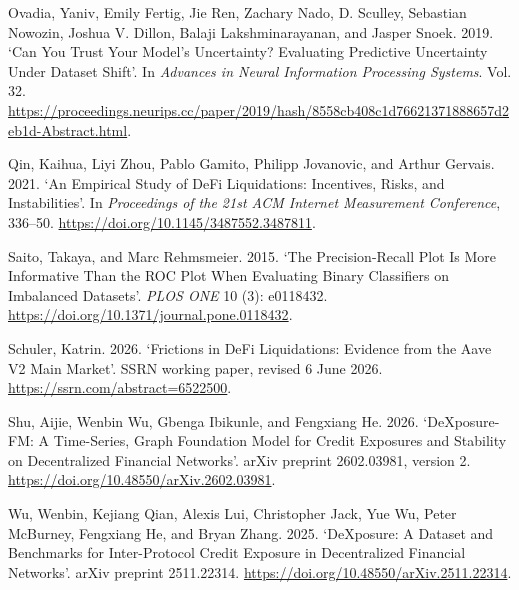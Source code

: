 \documentclass[
  10pt,
  a4paper,
]{article}
\newlength{\cslhangindent}
\newenvironment{CSLReferences}[2] %
 {\begin{list}{}{%
  \setlength{\itemindent}{0pt}
  \setlength{\leftmargin}{0pt}
  \setlength{\parsep}{0pt}
  \ifodd #1
   \setlength{\leftmargin}{\cslhangindent}
   \setlength{\itemindent}{-1\cslhangindent}
  \fi
  \setlength{\itemsep}{#2\baselineskip}}}
 {\end{list}}
\begin{document}
\begin{CSLReferences}{1}{0}
Ovadia, Yaniv, Emily Fertig, Jie Ren, Zachary Nado, D. Sculley,
Sebastian Nowozin, Joshua V. Dillon, Balaji Lakshminarayanan, and Jasper
Snoek. 2019. {`Can You Trust Your Model's Uncertainty? Evaluating
Predictive Uncertainty Under Dataset Shift'}. In \emph{Advances in
Neural Information Processing Systems}. Vol. 32.
\url{https://proceedings.neurips.cc/paper/2019/hash/8558cb408c1d76621371888657d2eb1d-Abstract.html}.

Qin, Kaihua, Liyi Zhou, Pablo Gamito, Philipp Jovanovic, and Arthur
Gervais. 2021. {`An Empirical Study of {DeFi} Liquidations: Incentives,
Risks, and Instabilities'}. In \emph{Proceedings of the 21st ACM
Internet Measurement Conference}, 336--50.
\url{https://doi.org/10.1145/3487552.3487811}.

Saito, Takaya, and Marc Rehmsmeier. 2015. {`The Precision-Recall Plot Is
More Informative Than the {ROC} Plot When Evaluating Binary Classifiers
on Imbalanced Datasets'}. \emph{PLOS ONE} 10 (3): e0118432.
\url{https://doi.org/10.1371/journal.pone.0118432}.

Schuler, Katrin. 2026. {`Frictions in {DeFi} Liquidations: Evidence from
the {Aave V2} Main Market'}. SSRN working paper, revised 6 June 2026.
\url{https://ssrn.com/abstract=6522500}.

Shu, Aijie, Wenbin Wu, Gbenga Ibikunle, and Fengxiang He. 2026.
{`{DeXposure-FM}: A Time-Series, Graph Foundation Model for Credit
Exposures and Stability on Decentralized Financial Networks'}. arXiv
preprint 2602.03981, version 2.
\url{https://doi.org/10.48550/arXiv.2602.03981}.

Wu, Wenbin, Kejiang Qian, Alexis Lui, Christopher Jack, Yue Wu, Peter
McBurney, Fengxiang He, and Bryan Zhang. 2025. {`{DeXposure}: A Dataset
and Benchmarks for Inter-Protocol Credit Exposure in Decentralized
Financial Networks'}. arXiv preprint 2511.22314.
\url{https://doi.org/10.48550/arXiv.2511.22314}.

\end{CSLReferences}
\end{document}
